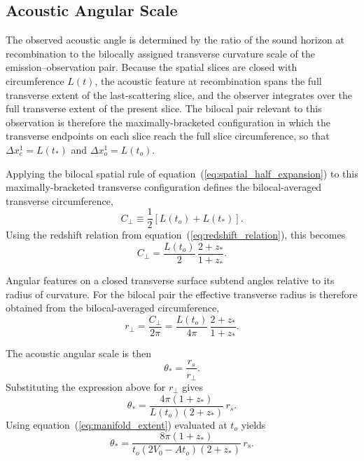 \documentclass[fontsize=12pt, paper=a4]{scrartcl}
\begin{document}
\subsection{Acoustic Angular Scale}

The observed acoustic angle is determined by the ratio of the sound horizon at recombination to the bilocally assigned transverse curvature scale of the emission--observation pair. Because the spatial slices are closed with circumference $L(t)$, the acoustic feature at recombination spans the full transverse extent of the last-scattering slice, and the observer integrates over the full transverse extent of the present slice. The bilocal pair relevant to this observation is therefore the maximally-bracketed configuration in which the transverse endpoints on each slice reach the full slice circumference, so that $\Delta x_e^1 = L(t_*)$ and $\Delta x_o^1 = L(t_o)$.

Applying the bilocal spatial rule of equation~(\ref{eq:spatial_half_expansion}) to this maximally-bracketed transverse configuration defines the bilocal-averaged transverse circumference,
\begin{equation}
C_\perp \equiv \frac12\left[L(t_o)+L(t_*)\right].
\label{eq:bilocal_transverse_circumference}
\end{equation}
Using the redshift relation from equation~(\ref{eq:redshift_relation}), this becomes
\begin{equation}
C_\perp=\frac{L(t_o)}{2}\,\frac{2+z_*}{1+z_*}.
\end{equation}

Angular features on a closed transverse surface subtend angles relative to its radius of curvature. For the bilocal pair the effective transverse radius is therefore obtained from the bilocal-averaged circumference,
\begin{equation}
r_\perp=\frac{C_\perp}{2\pi}=\frac{L(t_o)}{4\pi}\,\frac{2+z_*}{1+z_*}.
\end{equation}

The acoustic angular scale is then
\begin{equation}
\theta_*=\frac{r_s}{r_\perp}.
\end{equation}
Substituting the expression above for $r_\perp$ gives
\begin{equation}
\theta_*=\frac{4\pi(1+z_*)}{L(t_o)(2+z_*)}\,r_s.
\end{equation}
Using equation~(\ref{eq:manifold_extent}) evaluated at $t_o$ yields
\begin{equation}
\theta_*=\frac{8\pi(1+z_*)}{t_o(2V_0-A t_o)(2+z_*)}\,r_s.
\label{eq:acoustic_angle_final}
\end{equation}
\end{document}
